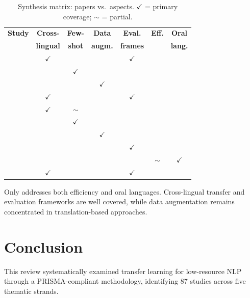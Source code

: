 \documentclass[
    language=english,
    doctype=article,
    institution=none,
    titlestyle=book,
]{../../omnilatex}
\begin{document}
\begin{table}[htbp]
\centering
\caption{Synthesis matrix: papers vs.\ aspects.  \(\checkmark\) = primary
coverage; \(\sim\) = partial.}
\label{tab:synthesis-matrix}
\small
\begin{tabular}{lcccccc}
\toprule
\textbf{Study} & \textbf{Cross-} & \textbf{Few-} & \textbf{Data}
    & \textbf{Eval.} & \textbf{Eff.} & \textbf{Oral} \\
    & \textbf{lingual} & \textbf{shot} & \textbf{augm.}
    & \textbf{frames} & & \textbf{lang.} \\
\midrule
\parencite{conneau2020xlmr}        & \(\checkmark\) & & & \(\checkmark\) & & \\
\parencite{schick2021pet}          & & \(\checkmark\) & & & & \\
\parencite{zhang2020backtranslation} & & & \(\checkmark\) & & & \\
\parencite{hu2020xtreme}           & \(\checkmark\) & & & \(\checkmark\) & & \\
\parencite{chi2020empirical}       & \(\checkmark\) & \(\sim\) & & & & \\
\parencite{gao2021calibrate}       & & \(\checkmark\) & & & & \\
\parencite{siddhant2020meta}       & & & \(\checkmark\) & & & \\
\parencite{eberle2022americasnli}  & & & & \(\checkmark\) & & \\
\parencite{bender2021stochastic}   & & & & & \(\sim\) & \(\checkmark\) \\
\parencite{oguz2021tydi}           & \(\checkmark\) & & & \(\checkmark\) & & \\
\bottomrule
\end{tabular}
\end{table}

Only \textcite{bender2021stochastic} addresses both efficiency and oral
languages.  Cross-lingual transfer and evaluation frameworks are well covered,
while data augmentation remains concentrated in translation-based approaches.

\section{Conclusion}
\label{sec:conclusion}
This review systematically examined transfer learning for low-resource NLP
through a PRISMA-compliant methodology, identifying 87 studies across five
thematic strands.
\end{document}
